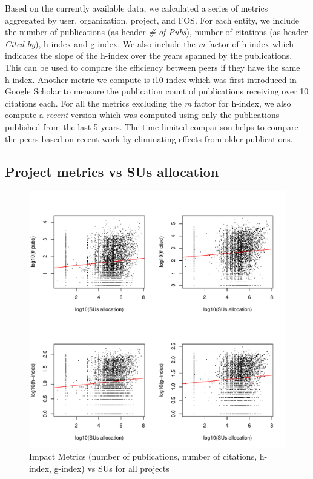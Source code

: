 \documentclass{sig-alternate}
\begin{document}
Based on the currently available data, we calculated a series of metrics aggregated by user, organization, project, and FOS.  For each entity, we include the number of publications (as header \emph{\# of Pubs}), number of citations (as header \emph{Cited by}), h-index and g-index. We also include the \emph{m} factor of h-index which indicates the slope of the h-index over the years spanned by the publications. This can be used to compare the efficiency between peers if they have the same h-index. Another metric we compute is i10-index \cite{www-i10index} which was first introduced in Google Scholar to measure the publication count of publications receiving over 10 citations each. For all the metrics excluding the \emph{m} factor for h-index, we also compute a \emph{recent} version which was computed using only the publications published from the last 5 years. The time limited comparison helps to compare the peers based on recent work by eliminating effects from older publications.

\subsection{Project metrics vs SUs allocation} 
 
\begin{figure}[!htb] 
  \centering 
    \includegraphics[width=1.0\columnwidth]{images/02_metrics_vs_alloc_proj.pdf} 
  \caption{Impact Metrics (number of publications, number of citations, h-index, g-index) vs SUs for all projects}\label{F:metrics-vs-alloc-proj} 
\end{figure} 
 
\end{document}

